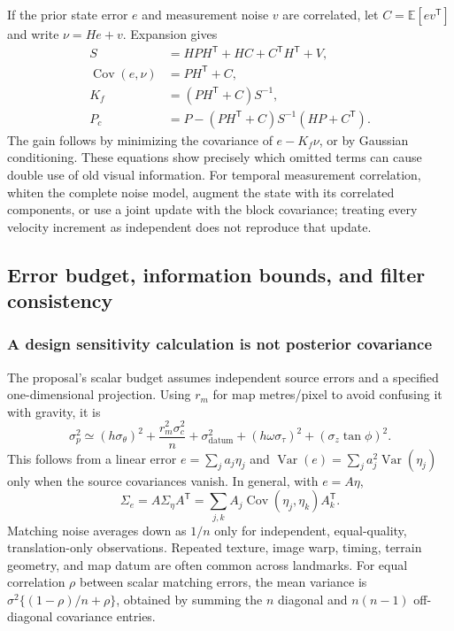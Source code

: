 \documentclass[11pt,a4paper]{article}
\numberwithin{equation}{section}
\begin{document}
If the prior state error $e$ and measurement noise $v$ are correlated,
let $C=\mathbb E[e v^{\mathsf T}]$ and write $\nu=He+v$. Expansion gives
\begin{align}
 S&=HPH^{\mathsf T}+HC+C^{\mathsf T}H^{\mathsf T}+V,\\
 \operatorname{Cov}(e,\nu)&=PH^{\mathsf T}+C,\\
 K_f&=(PH^{\mathsf T}+C)S^{-1},\\
 P_c&=P-(PH^{\mathsf T}+C)S^{-1}(HP+C^{\mathsf T}).
 \label{eq:correlated-measurement-update}
\end{align}
The gain follows by minimizing the covariance of $e-K_f\nu$, or by
Gaussian conditioning. These equations show precisely which omitted
terms can cause double use of old visual information. For temporal
measurement correlation, whiten the complete noise model, augment the
state with its correlated components, or use a joint update with the
block covariance; treating every velocity increment as independent
does not reproduce that update.

\subsection{Error budget, information bounds, and filter consistency}

\subsubsection{A design sensitivity calculation is not posterior covariance}

The proposal's scalar budget assumes independent source errors and a
specified one-dimensional projection. Using $r_m$ for map metres/pixel
to avoid confusing it with gravity, it is
\begin{equation}
 \sigma_p^2\simeq(h\sigma_\theta)^2+
       \frac{r_m^2\sigma_c^2}{n}+\sigma_{\mathrm{datum}}^2+
       (h\omega\sigma_\tau)^2+(\sigma_z\tan\phi)^2.
 \label{eq:scalar-budget}
\end{equation}
This follows from a linear error $e=\sum_j a_j\eta_j$ and
$\operatorname{Var}(e)=\sum_j a_j^2\operatorname{Var}(\eta_j)$ only when
the source covariances vanish. In general, with $e=A\eta$,
\begin{equation}
 \Sigma_e=A\Sigma_\eta A^{\mathsf T}
          =\sum_{j,k}A_j\operatorname{Cov}(\eta_j,\eta_k)A_k^{\mathsf T}.
\end{equation}
Matching noise averages down as $1/n$ only for independent, equal-quality,
translation-only observations. Repeated texture, image warp, timing,
terrain geometry, and map datum are often common across landmarks.
For equal correlation $\rho$ between scalar matching errors, the mean
variance is $\sigma^2\{(1-\rho)/n+\rho\}$, obtained by summing the
$n$ diagonal and $n(n-1)$ off-diagonal covariance entries.
\end{document}
